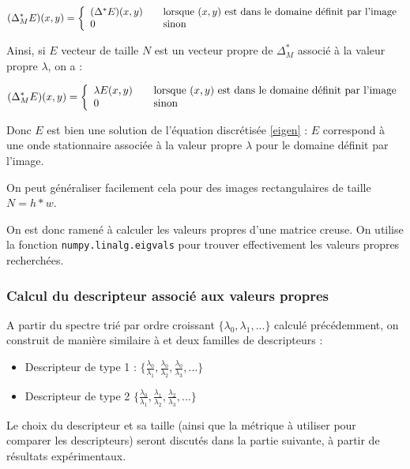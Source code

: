 \documentclass[a4paper,10pt]{article} %
\theoremstyle{definition} %
\begin{document}
\[ (\Delta^*_M E)(x,y) = \left\{ 
  \begin{array}{l l}
    (\Delta^* E)(x,y) & \quad \text{lorsque }(x,y) \text{ est dans le domaine définit par l'image}\\
    0 & \quad \text{sinon}
  \end{array} \right.\]
  
  
  Ainsi, si $E$ vecteur de taille $N$ est un vecteur propre de $\Delta^*_M$ associé à la valeur propre $\lambda$, on a : 
  
  \[ (\Delta^*_M E)(x,y) = \left\{ 
  \begin{array}{l l}
    \lambda E(x,y) & \quad \text{lorsque }(x,y) \text{ est dans le domaine définit par l'image}\\
    0 & \quad \text{sinon}
  \end{array} \right.\]
  
 Donc $E$ est bien une solution de l'équation discrétisée \eqref{eigen} : $E$ correspond à une onde stationnaire associée à la valeur propre $\lambda$ pour le domaine définit par l'image.
  
  On peut généraliser facilement cela pour des images rectangulaires de taille $N = h*w$.
  
  On est donc ramené à calculer les valeurs propres d'une matrice creuse. On utilise la fonction \texttt{numpy.linalg.eigvals} pour trouver effectivement les valeurs propres recherchées.
  
  
  \subsubsection*{Calcul du descripteur associé aux valeurs propres}


A partir du spectre trié par ordre croissant $\{\lambda_0, \lambda_1, ...\}$ calculé précédemment, on construit de manière similaire à \cite{Zuliani04} et \cite{KhabouHR07} deux familles de descripteurs : 
\begin{itemize}
\item Descripteur de type 1 : $\{\frac{\lambda_0}{\lambda_1}, \frac{\lambda_0}{\lambda_2}, \frac{\lambda_0}{\lambda_3}, ... \}$
\item Descripteur de type 2 $\{\frac{\lambda_0}{\lambda_1}, \frac{\lambda_1}{\lambda_2}, \frac{\lambda_2}{\lambda_3},...\}$
\end{itemize}

Le choix du descripteur et sa taille (ainsi que la métrique à utiliser pour comparer les descripteurs) seront discutés dans la partie suivante, à partir de résultats expérimentaux.
\end{document}
